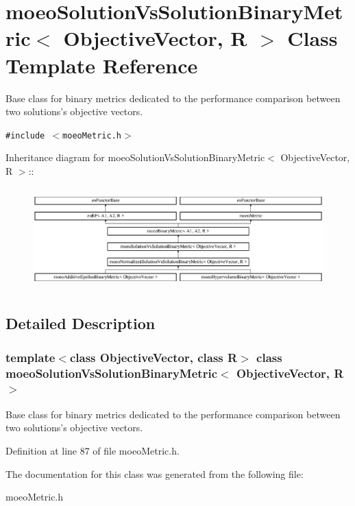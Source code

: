 \section{moeo\-Solution\-Vs\-Solution\-Binary\-Metric$<$ Objective\-Vector, R $>$ Class Template Reference}
\label{classmoeoSolutionVsSolutionBinaryMetric}
Base class for binary metrics dedicated to the performance comparison between two solutions's objective vectors.  


{\tt \#include $<$moeo\-Metric.h$>$}

Inheritance diagram for moeo\-Solution\-Vs\-Solution\-Binary\-Metric$<$ Objective\-Vector, R $>$::\begin{figure}[H]
\begin{center}
\leavevmode
\includegraphics[height=3.96226cm]{classmoeoSolutionVsSolutionBinaryMetric}
\end{center}
\end{figure}


\subsection{Detailed Description}
\subsubsection*{template$<$class Objective\-Vector, class R$>$ class moeo\-Solution\-Vs\-Solution\-Binary\-Metric$<$ Objective\-Vector, R $>$}

Base class for binary metrics dedicated to the performance comparison between two solutions's objective vectors. 



Definition at line 87 of file moeo\-Metric.h.

The documentation for this class was generated from the following file:\begin{CompactItemize}
\item 
moeo\-Metric.h\end{CompactItemize}
